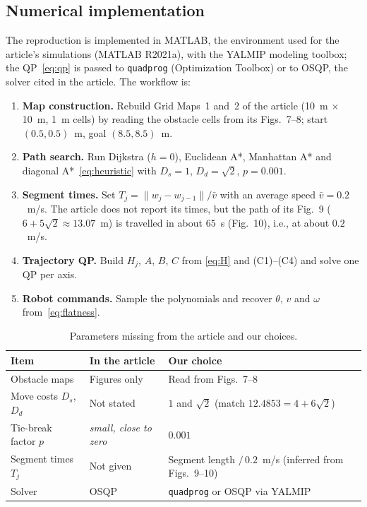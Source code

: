 \subsection{Numerical implementation}
The reproduction is implemented in MATLAB, the environment used for the article's simulations (MATLAB R2021a), with the YALMIP modeling toolbox; the QP~\eqref{eq:qp} is passed to \texttt{quadprog} (Optimization Toolbox) or to OSQP, the solver cited in the article. The workflow is:
\begin{enumerate}
\item \textbf{Map construction.} Rebuild Grid Maps~1 and~2 of the article (10~m $\times$ 10~m, 1~m cells) by reading the obstacle cells from its Figs.~7--8; start $(0.5,0.5)$~m, goal $(8.5,8.5)$~m.
\item \textbf{Path search.} Run Dijkstra ($h=0$), Euclidean A*, Manhattan A* and diagonal A*~\eqref{eq:heuristic} with $D_s=1$, $D_d=\sqrt{2}$, $p=0.001$.
\item \textbf{Segment times.} Set $T_j = \lVert w_j - w_{j-1}\rVert / \bar{v}$ with an average speed $\bar{v}=0.2$~m/s. The article does not report its times, but the path of its Fig.~9 ($6+5\sqrt{2}\approx 13.07$~m) is travelled in about $65$~s (Fig.~10), i.e., at about $0.2$~m/s.
\item \textbf{Trajectory QP.} Build $H_j$, $A$, $B$, $C$ from \eqref{eq:H} and (C1)--(C4) and solve one QP per axis.
\item \textbf{Robot commands.} Sample the polynomials and recover $\theta$, $v$ and $\omega$ from~\eqref{eq:flatness}.
\end{enumerate}

\begin{table}[htbp]
\centering
\caption{Parameters missing from the article and our choices.}
\label{tab:choices}
\begin{tabular}{>{\raggedright\arraybackslash}p{3.2cm} >{\raggedright\arraybackslash}p{3.4cm} >{\raggedright\arraybackslash}p{4.2cm}}
\toprule
\textbf{Item} & \textbf{In the article} & \textbf{Our choice}\\
\midrule
Obstacle maps & Figures only & Read from Figs.~7--8\\
Move costs $D_s$, $D_d$ & Not stated & $1$ and $\sqrt{2}$ (match $12.4853 = 4+6\sqrt{2}$)\\
Tie-break factor $p$ & \emph{small, close to zero} & $0.001$\\
Segment times $T_j$ & Not given & Segment length $/\,0.2$~m/s (inferred from Figs.~9--10)\\
Solver & OSQP & \texttt{quadprog} or OSQP via YALMIP\\
\bottomrule
\end{tabular}
\end{table}

